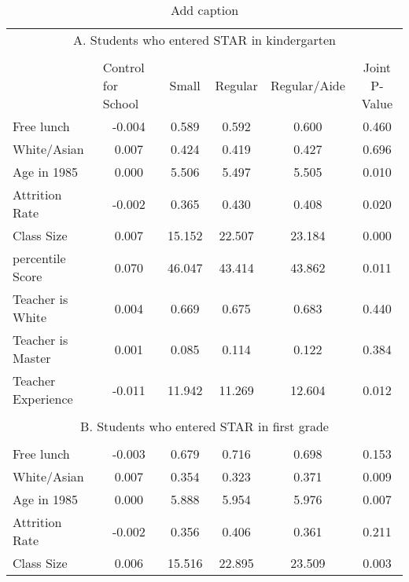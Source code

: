\documentclass{article}
\begin{document}
\begin{table}[htbp]
  \centering
  \caption{Add caption}
    \begin{tabular}{llccccc}
    \toprule
    \multicolumn{7}{c}{A. Students who entered STAR in kindergarten} \\
          &       &       &       &       &       &  \\
          &       & \multicolumn{1}{l}{Control for School} & Small & Regular & Regular/Aide & Joint P-Value \\
    \midrule
    \midrule
    \multicolumn{2}{l}{Free lunch} & -0.004  & 0.589  & 0.592  & 0.600  & 0.460  \\
    \multicolumn{2}{l}{White/Asian} & 0.007  & 0.424  & 0.419  & 0.427  & 0.696  \\
    \multicolumn{2}{l}{Age in 1985} & 0.000  & 5.506  & 5.497  & 5.505  & 0.010  \\
    \multicolumn{2}{l}{Attrition Rate} & -0.002  & 0.365  & 0.430  & 0.408  & 0.020  \\
    \multicolumn{2}{l}{Class Size} & 0.007  & 15.152  & 22.507  & 23.184  & 0.000  \\
    \multicolumn{2}{l}{percentile Score} & 0.070  & 46.047  & 43.414  & 43.862  & 0.011  \\
    \multicolumn{2}{l}{Teacher is White} & 0.004  & 0.669  & 0.675  & 0.683  & 0.440  \\
    \multicolumn{2}{l}{Teacher is Master} & 0.001  & 0.085  & 0.114  & 0.122  & 0.384  \\
    \multicolumn{2}{l}{Teacher Experience} & -0.011  & 11.942  & 11.269  & 12.604  & 0.012  \\
          &       &       &       &       &       &  \\
    \multicolumn{7}{c}{B. Students who entered STAR in first grade} \\
          &       &       &       &       &       &  \\
    \multicolumn{2}{l}{Free lunch} & -0.003  & 0.679  & 0.716  & 0.698  & 0.153  \\
    \multicolumn{2}{l}{White/Asian} & 0.007  & 0.354  & 0.323  & 0.371  & 0.009  \\
    \multicolumn{2}{l}{Age in 1985} & 0.000  & 5.888  & 5.954  & 5.976  & 0.007  \\
    \multicolumn{2}{l}{Attrition Rate} & -0.002  & 0.356  & 0.406  & 0.361  & 0.211  \\
    \multicolumn{2}{l}{Class Size} & 0.006  & 15.516  & 22.895  & 23.509  & 0.003  \\

\end{tabular}
\end{table}
\end{document}
